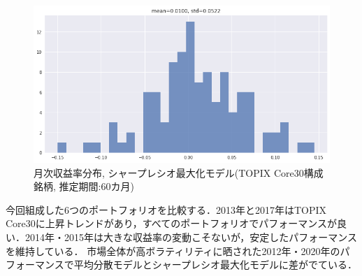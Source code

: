 \documentclass[dvipdfmx,autodetect-engine]{jsarticle}
\begin{document}
\begin{figure}[htbp]
\begin{minipage}{0.5\hsize}
\begin{center}
\includegraphics[width=1.0\hsize]{./figures/srmp_tpx30_w=60_hist.png}
\end{center}
\caption{\small 月次収益率分布, シャープレシオ最大化モデル(TOPIX Core30構成銘柄, 推定期間:60カ月)}
\label{fig:32}
\end{minipage}
\end{figure}

\newpage

今回組成した6つのポートフォリオを比較する．2013年と2017年はTOPIX Core30に上昇トレンドがあり，すべてのポートフォリオでパフォーマンスが良い．2014年・2015年は大きな収益率の変動こそないが，安定したパフォーマンスを維持している．
市場全体が高ボラティリティに晒された2012年・2020年のパフォーマンスで平均分散モデルとシャープレシオ最大化モデルに差がでている．
\end{document}
